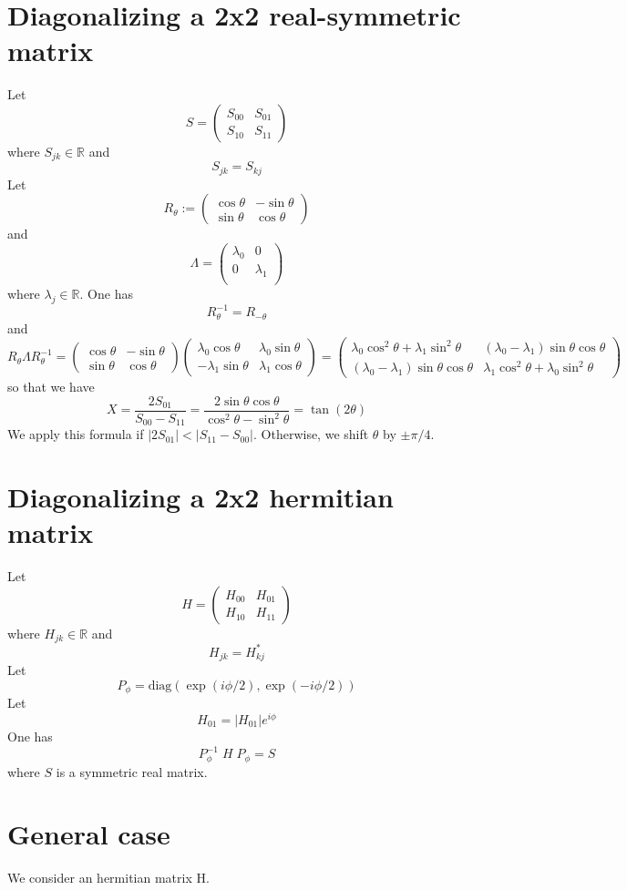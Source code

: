 \documentclass{article}
\begin{document}
\section{Diagonalizing a 2x2 real-symmetric matrix}
Let
$$
S = \left(\begin{array}{cc} S_{00} & S_{01}\\ S_{10}&S_{11}\end{array}\right)
$$
where $S_{jk}\in\mathbb{R}$ and 
$$
S_{jk} = S_{kj}
$$
Let
$$
R_\theta := \left(\begin{array}{cc} \cos\theta&-\sin\theta\\ \sin\theta&\cos\theta \end{array}\right)
$$
and
$$
\Lambda = \left(\begin{array}{cc}\lambda_0 & 0\\ 0 & \lambda_1\\ \end{array}\right)
$$
where $\lambda_j\in\mathbb{R}$.
One has
$$
R_\theta^{-1}= R_{-\theta}
$$
and
$$
R_{\theta}\Lambda R_{\theta}^{-1} = \left(\begin{array}{cc} \cos\theta&-\sin\theta\\ \sin\theta&\cos\theta \end{array}\right)\left(\begin{array}{cc} \lambda_0\cos\theta&\lambda_0\sin\theta\\ -\lambda_1\sin\theta&\lambda_1\cos\theta \end{array}\right)=\left(\begin{array}{cc} \lambda_0\cos^2\theta+\lambda_1\sin^2\theta&(\lambda_0-\lambda_1)\sin\theta\cos\theta\\ (\lambda_0-\lambda_1)\sin\theta\cos\theta& \lambda_1\cos^2\theta+\lambda_0\sin^2\theta\end{array}\right)
$$
so that we have
$$
X = \frac{2S_{01}}{S_{00}-S_{11}}=\frac{2\sin\theta\cos\theta}{\cos^2\theta-\sin^2\theta} = \tan(2\theta)
$$
We apply this formula if $|2S_{01}|<|S_{11}-S_00|$. Otherwise, we shift $\theta$ by $\pm \pi/4$.
\section{Diagonalizing a 2x2 hermitian matrix}
Let
$$
H = \left(\begin{array}{cc} H_{00} & H_{01}\\ H_{10}&H_{11}\end{array}\right)
$$
where $H_{jk}\in\mathbb{R}$ and 
$$
H_{jk} = H_{kj}^*
$$
Let
$$
P_{\phi} = \text{diag}\left(\exp(i\phi/2),\exp(-i\phi/2)\right)
$$
Let
$$
H_{01} = |H_{01}| e^{i\phi}
$$
One has
$$
P_{\phi}^{-1} \;H\;P_{\phi} = S
$$
where $S$ is a symmetric real matrix.
\section{General case}
We consider an hermitian matrix H. 
\end{document}
